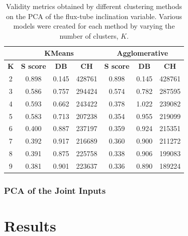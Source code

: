 \begin{table}[h]
    \caption[Validity metrics for PCA of the Flux-tube Inclination]{Validity metrics obtained by different clustering methods on the PCA of the flux-tube inclination variable. Various models were created for each method by varying the number of clusters, $K$.}\label{tab:pca_a}
    \begin{tabular}{@{}cccc|ccc@{}}
    \toprule
    \multicolumn{1}{l}{}            & \multicolumn{3}{c|}{\textbf{KMeans}}         & \multicolumn{3}{c}{\textbf{Agglomerative}}   \\ \midrule
    \multicolumn{1}{c|}{\textbf{K}} & \textbf{S score} & \textbf{DB} & \textbf{CH} & \textbf{S score} & \textbf{DB} & \textbf{CH} \\ \midrule
    \multicolumn{1}{c|}{2}          & 0.898            & 0.145       & 428761  & 0.898            & 0.145       & 428761  \\
    \multicolumn{1}{c|}{3}          & 0.586            & 0.757       & 294424  & 0.574            & 0.782       & 287595  \\
    \multicolumn{1}{c|}{4}          & 0.593            & 0.662       & 243422  & 0.378            & 1.022       & 239082  \\
    \multicolumn{1}{c|}{5}          & 0.583            & 0.713       & 207238  & 0.354            & 0.955       & 219099  \\
    \multicolumn{1}{c|}{6}          & 0.400            & 0.887       & 237197  & 0.359            & 0.924       & 215351  \\
    \multicolumn{1}{c|}{7}          & 0.392            & 0.917       & 216689  & 0.360            & 0.900       & 211272  \\
    \multicolumn{1}{c|}{8}          & 0.391            & 0.875       & 225758  & 0.338            & 0.906       & 199083  \\
    \multicolumn{1}{c|}{9}          & 0.381            & 0.901       & 223637  & 0.336            & 0.890       & 189224  \\ \bottomrule
    \end{tabular}
    \end{table}

\subsubsection{PCA of the Joint Inputs}\label{sec:pca_joint}



\section{Results}\label{sec:clustering_results}
